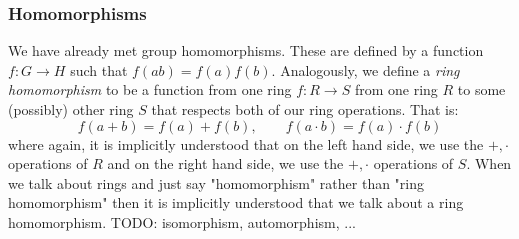 











\subsubsection{Homomorphisms}
We have already met group homomorphisms. These are defined by a function $f: G \rightarrow H$ such that $f(a b) = f(a) f(b)$. Analogously, we define a \emph{ring homomorphism} to be a function from one ring $f: R \rightarrow  S$ from one ring $R$ to some (possibly) other ring $S$ that respects both of our ring operations. That is:
\begin{equation}
  f(a   +   b) = f(a)   +   f(b), \qquad
  f(a \cdot b) = f(a) \cdot f(b)
\end{equation}
where again, it is implicitly understood that on the left hand side, we use the $+,\cdot$ operations of $R$ and on the right hand side, we use the $+,\cdot$ operations of $S$. When we talk about rings and just say "homomorphism" rather than "ring homomorphism" then it is implicitly understood that we talk about a ring homomorphism. TODO: isomorphism, automorphism, ...

